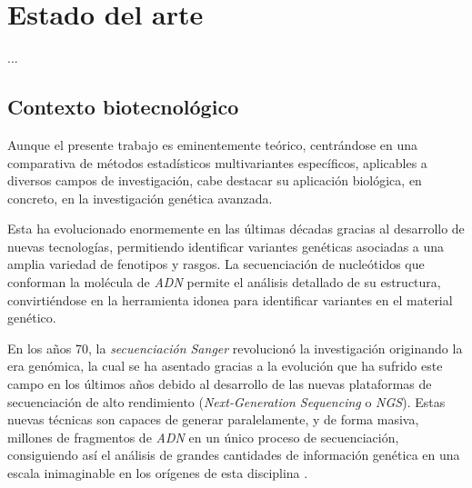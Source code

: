\documentclass[IB,BIB]{TFUOC}%
\begin{document}


\chapter{Estado del arte}
\label{chap:Introducción}

%
%

...

\section{Contexto biotecnológico}
\label{sec:Contexto biotecnológico}

Aunque el presente trabajo es eminentemente teórico, centrándose en una comparativa de métodos estadísticos multivariantes específicos, aplicables a diversos campos de investigación, cabe destacar su aplicación biológica, en concreto, en la investigación genética avanzada.

Esta ha evolucionado enormemente en las últimas décadas gracias al desarrollo de nuevas tecnologías, permitiendo identificar variantes genéticas asociadas a una amplia variedad de fenotipos y rasgos. La secuenciación de nucleótidos que conforman la molécula de \textit{ADN} permite el análisis detallado de su estructura, convirtiéndose en la herramienta idonea para identificar variantes en el material genético.

En los años 70, la \textit{secuenciación Sanger} revolucionó la investigación originando la era genómica, la cual se ha asentado gracias a la evolución que ha sufrido este campo en los últimos años debido al desarrollo de las nuevas plataformas de secuenciación de alto rendimiento (\textit{Next-Generation Sequencing} o \textit{NGS}). Estas nuevas técnicas son capaces de generar paralelamente, y de forma masiva, millones de fragmentos de \textit{ADN} en un único proceso de secuenciación, consiguiendo así el análisis de grandes cantidades de información genética en una escala inimaginable en los orígenes de esta disciplina \cite{behjati_what_2013,noauthor_next-generation_nodate}.
\end{document}
